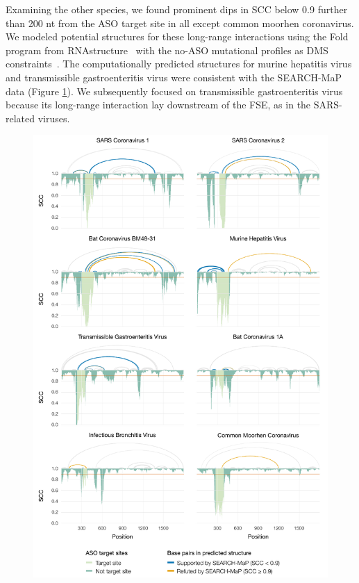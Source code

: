 \documentclass[main.tex]{subfiles}
\begin{document}
Examining the other species, we found prominent dips in SCC below 0.9 further than 200 nt from the ASO target site in all except common moorhen coronavirus.
We modeled potential structures for these long-range interactions using the Fold program from RNAstructure~\cite{Mathews2004a} with the no-ASO mutational profiles as DMS constraints~\cite{Cordero2012}.
The computationally predicted structures for murine hepatitis virus and transmissible gastroenteritis virus were consistent with the SEARCH-MaP data (Figure \ref{covs}).
We subsequently focused on transmissible gastroenteritis virus because its long-range interaction lay downstream of the FSE, as in the SARS-related viruses.


\begin{figure}[ht]
	\includegraphics[height=0.95\textheight]{../MainFigures/covs/covs.pdf}
	\caption{}
	\label{covs}
\end{figure}
\end{document}
